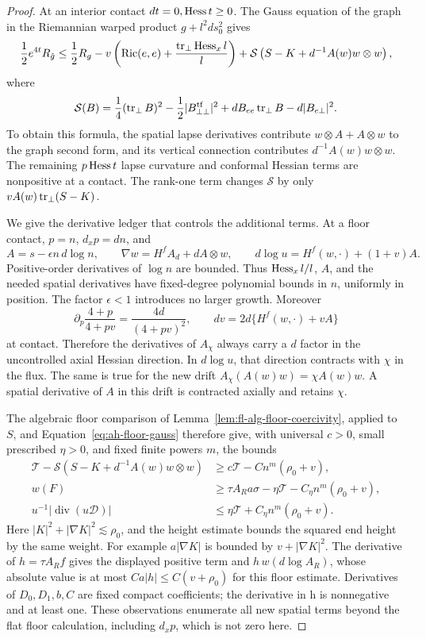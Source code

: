 \begin{proof}
At an interior contact \(dt=0,\operatorname{Hess} t\ge0\).  The Gauss equation of
the graph in the Riemannian warped product \(g+l^2ds_0^2\) gives
\begin{equation}\label{eq:ah-floor-gauss}
 \frac12e^{4t}R_{\hat g}
 \le \frac12R_g
   -v\left(\operatorname{Ric}(e,e)+\frac{\operatorname{tr}_\perp\operatorname{Hess}_xl}{l}\right)
   +\mathcal S\left(S-K+d^{-1}A(w)w\otimes w\right),
\end{equation}
where
\[
 \mathcal S(B)=\frac14(\operatorname{tr}_\perp B)^2
   -\frac12|B_{\perp\perp}^{\rm tf}|^2
   +dB_{ee}\operatorname{tr}_\perp B-d|B_{e\perp}|^2.
\]
To obtain this formula, the spatial lapse derivatives contribute
\(w\otimes A+A\otimes w\) to the graph second form, and its
vertical connection contributes \(d^{-1}A(w)w\otimes w\).
The remaining \(p\operatorname{Hess} t\) lapse curvature and conformal Hessian
terms are nonpositive at a contact.  The rank-one term changes
\(\mathcal S\) by only \(vA(w)\operatorname{tr}_\perp(S-K)\).

We give the derivative ledger that controls the additional terms.
At a floor contact, \(p=n\), \(d_xp=dn\), and
\[
 A=s-\epsilon n\,d\log n,\qquad
 \nabla w=H^fA_d+dA\otimes w,\qquad
 d\log u=H^f(w,\cdot)+(1+v)A .
\]
Positive-order derivatives of \(\log n\) are bounded.  Thus
\(\operatorname{Hess}_xl/l\), \(A\), and the needed spatial derivatives have
fixed-degree polynomial bounds in \(n\), uniformly in position.
The factor \(\epsilon<1\) introduces no larger growth.  Moreover
\[
 \partial_p\frac{4+p}{4+pv}
   =\frac{4d}{(4+pv)^2},\qquad
 dv=2d\{H^f(w,\cdot)+vA\}
\]
at contact.  Therefore the derivatives of \(A_\chi\) always carry
a \(d\) factor in the uncontrolled axial Hessian direction.
In \(d\log u\), that direction contracts with \(\chi\) in the flux.
The same is true for the new drift
\(A_\chi(A(w)w)=\chi A(w)w\).
A spatial derivative of \(A\) in this drift is contracted axially
and retains \(\chi\).

The algebraic floor comparison of
Lemma~\ref{lem:fl-alg-floor-coercivity}, applied to \(S\), and
Equation~\eqref{eq:ah-floor-gauss} therefore give, with universal
\(c>0\), small prescribed \(\eta>0\), and fixed finite powers \(m\),
the bounds
\[
 \begin{split}
 \mathcal T-\mathcal S
       \left(S-K+d^{-1}A(w)w\otimes w\right)
 &\ge c\mathcal T-Cn^m(\rho_0+v),\\
 w(F)&\ge\tau A_Ra\sigma-\eta\mathcal T-C_\eta n^m(\rho_0+v),\\
 u^{-1}|\operatorname{div}(u\mathcal D)|
 &\le\eta\mathcal T+C_\eta n^m(\rho_0+v).
 \end{split}
\]
Here \(|K|^2+|\nabla K|^2\lesssim\rho_0\), and the height
estimate bounds the squared end height by the same weight.
For example \(a|\nabla K|\) is bounded by \(v+|\nabla K|^2\).
The derivative of \(h=\tau A_Rf\) gives the displayed positive
term and \(h\,w(d\log A_R)\), whose absolute value is at most
\(Ca|h|\le C(v+\rho_0)\) for this floor estimate.
Derivatives of \(D_0,D_1,b,C\) are fixed compact coefficients;
the derivative in h is nonnegative and at least one.  These
observations enumerate all new spatial terms beyond the flat
floor calculation, including \(d_xp\), which is not zero here.


\end{proof}
